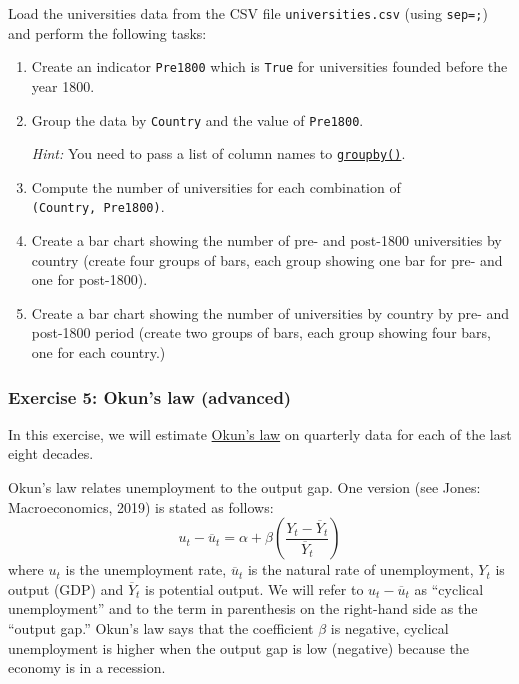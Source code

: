 \documentclass[10pt]{scrartcl}
\begin{document}
Load the universities data from the CSV file \texttt{universities.csv}
(using \texttt{sep=\textquotesingle{};\textquotesingle{}}) and perform
the following tasks:

\begin{enumerate}
\def\labelenumi{\arabic{enumi}.}
\item
  Create an indicator \texttt{Pre1800} which is \texttt{True} for
  universities founded before the year 1800.
\item
  Group the data by \texttt{Country} and the value of \texttt{Pre1800}.

  \emph{Hint:} You need to pass a list of column names to
  \href{https://pandas.pydata.org/pandas-docs/stable/reference/api/pandas.DataFrame.groupby.html}{\texttt{groupby()}}.
\item
  Compute the number of universities for each combination of
  \texttt{(Country,\ Pre1800)}.
\item
  Create a bar chart showing the number of pre- and post-1800
  universities by country (\ie create four groups of bars, each group
  showing one bar for pre- and one for post-1800).
\item
  Create a bar chart showing the number of universities by country by
  pre- and post-1800 period (\ie create two groups of bars, each group
  showing four bars, one for each country.)
\end{enumerate}

    \hypertarget{exercise-5-okuns-law-advanced}{%
\subsubsection{Exercise 5: Okun's law
(advanced)}\label{exercise-5-okuns-law-advanced}}

In this exercise, we will estimate
\href{https://en.wikipedia.org/wiki/Okun\%27s_law}{Okun's law} on
quarterly data for each of the last eight decades.

Okun's law relates unemployment to the output gap. One version (see
Jones: Macroeconomics, 2019) is stated as follows: \[
u_t - \overline{u}_{t} = 
\alpha + \beta \left(\frac{Y_t - \overline{Y}_t}{\overline{Y}_t}\right)
\] where \(u_t\) is the unemployment rate, \(\overline{u}_{t}\) is the
natural rate of unemployment, \(Y_t\) is output (GDP) and
\(\overline{Y}_{t}\) is potential output. We will refer to
\(u_t-\overline{u}_{t}\) as ``cyclical unemployment'' and to the term in
parenthesis on the right-hand side as the ``output gap.'' Okun's law
says that the coefficient \(\beta\) is negative, \ie cyclical
unemployment is higher when the output gap is low (negative) because the
economy is in a recession.
\end{document}
